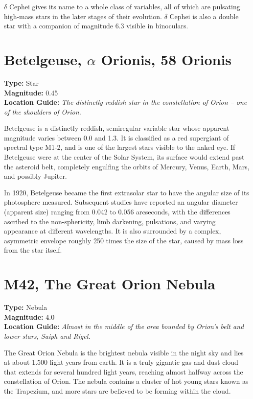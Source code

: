 $\delta$ Cephei gives its name to a whole class of variables, all of
which are pulsating high-mass stars in the later stages of their
evolution. $\delta$ Cephei is also a double star with a companion of
magnitude 6.3 visible in binoculars.

\section{Betelgeuse, \texorpdfstring{$\alpha$}{alpha} Orionis, 58 Orionis}
\textbf{Type:} Star \\
\textbf{Magnitude:} 0.45 \\
\textbf{Location Guide:} \textit{The distinctly reddish star in the constellation of Orion -- one of the shoulders of Orion.} 

Betelgeuse is a distinctly reddish, semiregular variable star whose apparent magnitude varies between 0.0 and 1.3.
It is classified as a red supergiant of spectral type M1-2, and is one of the largest stars visible to the naked eye.
If Betelgeuse were at the center of the Solar System, its surface would extend past the asteroid belt,
completely engulfing the orbits of Mercury, Venus, Earth, Mars, and possibly Jupiter.

In 1920, Betelgeuse became the first extrasolar star to have the angular size of its photosphere measured.
Subsequent studies have reported an angular diameter (apparent size) ranging from 0.042 to 0.056 arcseconds,
with the differences ascribed to the non-sphericity, limb darkening, pulsations, and varying appearance at different wavelengths.
It is also surrounded by a complex, asymmetric envelope roughly 250 times the size of the star, caused by mass loss from the star itself.  

\section{M42, The Great Orion Nebula} 
\textbf{Type:} Nebula \\
\textbf{Magnitude:} 4.0 \\
\textbf{Location Guide:} \textit{Almost in the middle of the area bounded by Orion's belt and lower stars, Saiph and Rigel.} 

The Great Orion Nebula is the brightest nebula visible in the night
sky and lies at about 1.500 light years from earth. It is a truly
gigantic gas and dust cloud that extends for several hundred light
years, reaching almost halfway across the constellation of Orion. The
nebula contains a cluster of hot young stars known as the Trapezium,
and more stars are believed to be forming within the cloud.

